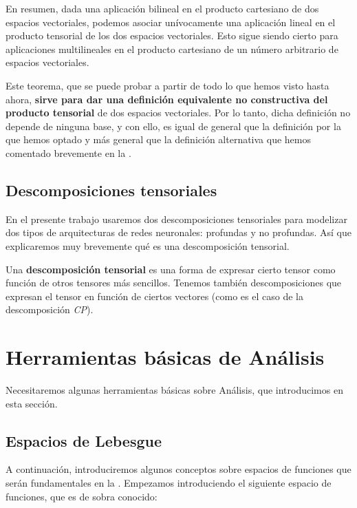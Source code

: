 En resumen, dada una aplicación bilineal en el producto cartesiano de dos espacios vectoriales, podemos asociar unívocamente una aplicación lineal en el producto tensorial de los dos espacios vectoriales. Esto sigue siendo cierto para aplicaciones multilineales en el producto cartesiano de un número arbitrario de espacios vectoriales.

Este teorema, que se puede probar a partir de todo lo que hemos visto hasta ahora, \textbf{sirve para dar una definición equivalente no constructiva del producto tensorial} de dos espacios vectoriales. Por lo tanto, dicha definición no depende de ninguna base, y con ello, es igual de general que la definición por la que hemos optado y más general que la definición alternativa que hemos comentado brevemente en la .

\subsection{Descomposiciones tensoriales}

En el presente trabajo usaremos dos descomposiciones tensoriales para modelizar dos tipos de arquitecturas de redes neuronales: profundas y no profundas. Así que explicaremos muy brevemente qué es una descomposición tensorial.

Una \textbf{descomposición tensorial} es una forma de expresar cierto tensor como función de otros tensores más sencillos. Tenemos también descomposiciones que expresan el tensor en función de ciertos vectores (como es el caso de la descomposición \textit{CP}).

\section{Herramientas básicas de Análisis} \label{sec:preliminares_funcional}

Necesitaremos algunas herramientas básicas sobre Análisis, que introducimos en esta sección.

\subsection{Espacios de Lebesgue}

A continuación, introduciremos algunos conceptos sobre espacios de funciones que serán fundamentales en la . Empezamos introduciendo el siguiente espacio de funciones, que es de sobra conocido:

